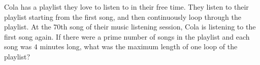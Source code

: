 Cola has a playlist they love to listen to in their free time. They listen to their playlist starting from the first song, and then continuously loop through the playlist. At the $70$th song of their music listening session, Cola is listening to the first song again. If there were a prime number of songs in the playlist and each song was $4$ minutes long, what was the maximum length of one loop of the playlist?

